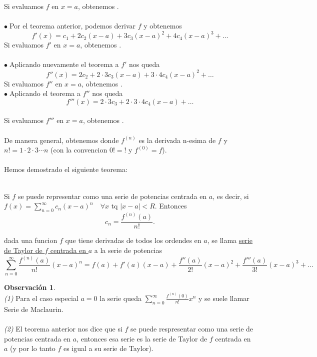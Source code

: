 \documentclass{article}
\theoremstyle{definition}
\theoremstyle{definition}
\newtheorem*{obs}{Observación}
\theoremstyle{remark}
\newcommand\bl{$\bullet\;$}
\begin{document}
 Si evaluamos $f$ en $x=a$, obtenemos .
\\\\
\bl Por el teorema anterior, podemos derivar $f$ y obtenemos \[
f'(x)=c_1+2c_2(x-a)+3c_3(x-a)^2+4c_4(x-a)^3+\dots
\]
 Si evaluamos $f'$ en $x=a$, obtenemos .
\\\\
\bl Aplicando nuevamente el teorema a $f'$ nos queda 
\[ 
f''(x)=2c_2+2\cdot 3 c_3 (x-a)+3\cdot 4 c_4(x-a)^2+\dots
\]
 Si evaluamos $f''$ en $x=a$, obtenemos . \\  

\bl Aplicando el teorema a $f''$ nos queda \[ 
f'''(x)=2\cdot 3 c_3+2\cdot3\cdot4 c_4(x-a)+\dots
\] \\
 Si evaluamos $f'''$ en $x=a$, obtenemos .
\\\\
De manera general, obtenemos  donde $f^{(n)}$ es la derivada n-esima  de $f$ y $n!=1\cdot2\cdot3\cdots n$ \big(con la convencion $0!=!$ y $f^{(0)}=f$\big).
\\\\
Hemos demostrado el siguiente teorema:
\begin{teo} \; \\
Si $f$ se puede representar como una serie de potencias centrada en $a$, es decir, si $f(x)=\sum_{n=0}^{\infty}{c_n(x-a)^n}\quad \forall x$ tq $|x-a|<R$. Entonces \[
  c_n=\frac{f^{(n)}(a)}{n!}.
\] 
\end{teo}
\pagebreak
\begin{defi}
  dada una funcion $f$ que tiene derivadas de todos los ordendes en $a$, se llama \underline{serie de Taylor de $f$ centrada en $a$} a la serie de potencias \[
  \sum_{n=0}^{\infty}{\frac{f^{(n)}(a)}{n!}(x-a)^n}
  =
f(a) + f'(a)(x-a)+\frac{f''(a)}{2!}(x-a)^2+\frac{f'''(a)}{3!}(x-a)^3+\dots
\]
\end{defi}

\begin{obs}\; \\
  \emph{(1)} Para el caso especial $a=0$ la serie queda $\sum_{n=0}^{\infty}{\frac{f^{(n)}(0)}{n!}x^n}$ y se suele llamar Serie de Maclaurin. \\ \\
  \emph{(2)} El teorema anterior nos dice que si $f$ se puede respresentar como una serie de potencias centrada en $a$, entonces esa serie es la serie de Taylor de $f$ centrada en $a$ (y por lo tanto $f$ es igual a su serie de Taylor).
\end{obs}
\end{document}

